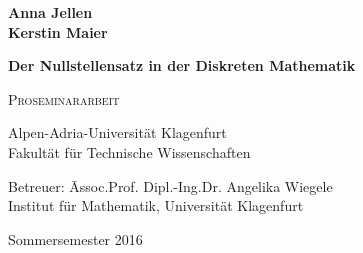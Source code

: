 \documentclass{article}
\theoremstyle{dotless}
\begin{document}
%
%


\begin{titlepage}
\vspace*{1cm}
  \begin{center}   
	    \LARGE \textbf{Anna Jellen} \\
      \LARGE \textbf{Kerstin Maier}
  \end{center}
\vspace{1cm}
  \begin{center}
 \Huge \textbf{Der Nullstellensatz in der Diskreten Mathematik} 
  \end{center}
\vspace{1cm}
\begin{center}
\huge  \textsc{Proseminararbeit}
\end{center}
\vspace{1cm}
\begin{center}
\LARGE Alpen-Adria-Universit\"{a}t Klagenfurt\\
\LARGE Fakult\"{a}t f\"{u}r  Technische Wissenschaften
\end{center}
\vspace{1.5cm}
\Large
\begin{center}
 Betreuer:  \= Assoc.Prof. Dipl.-Ing.Dr. Angelika Wiegele 
 \\ Institut f\"{u}r Mathematik, Universität Klagenfurt\\ \end{center}
  \begin{flushright} Sommersemester 2016 \end{flushright}
\end{titlepage}
	


\nocite{*}

\renewcommand{\contentsname}{Inhaltsverzeichnis}

\tableofcontents







\listoffigures


\end{document}
